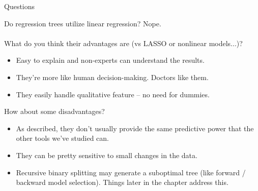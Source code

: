 \documentclass[mathserif, aspectratio=169]{beamer}
\begin{document}
\begin{frame}{Questions}

Do regression trees utilize linear regression? \pause Nope.  \\~\\

What do you think their advantages are (vs LASSO or nonlinear models...)? \pause

\begin{itemize}
\item Easy to explain and non-experts can understand the results.
\item They're more like human decision-making.  Doctors like them.
\item They easily handle qualitative feature -- no need for dummies.
\end{itemize}

\pause How about some disadvantages? \pause

\begin{itemize}
\item As described, they don't usually provide the same predictive power that the other tools we've studied can.
\item They can be pretty sensitive to small changes in the data. 
\item Recursive binary splitting may generate a suboptimal tree (like forward / backward model selection).  Things later in the chapter address this.
\end{itemize}
\end{frame}
\end{document}
